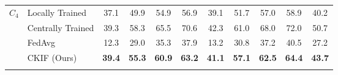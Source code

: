 \begin{table}[b]
\begin{tabular}{llcccc|cccc|c}
    \midrule
    $C_4$ & Locally Trained   & 37.1 & 49.9 & 54.9 & 56.9 & 39.1 & 51.7 & 57.0 & 58.9 & 40.2 \\
                   & Centrally Trained & 39.3 & 58.3 & 65.5 & 70.6 & 42.3 & 61.0 & 68.0 & 72.0 & 50.7 \\
                   & FedAvg   & 12.3 & 29.0 & 35.3 & 37.9 & 13.2 & 30.8 & 37.2 & 40.5 & 27.2 \\
                   & CKIF (Ours)     & \textbf{39.4} & \textbf{55.3} & \textbf{60.9} & \textbf{63.2} & \textbf{41.1} & \textbf{57.1} & \textbf{62.5} & \textbf{64.4} & \textbf{43.7} \\
    \botrule
    \end{tabular}
\end{table}


